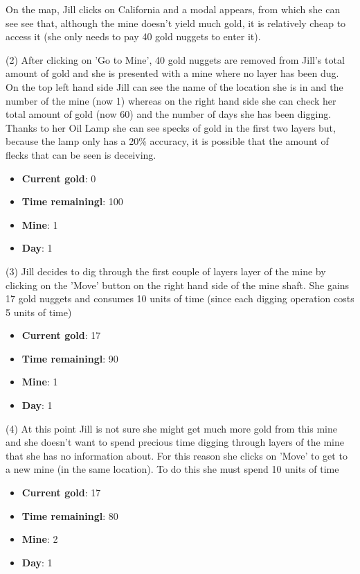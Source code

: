 \documentclass{mproj}
\begin{document}
On the map, Jill clicks on California and a modal appears, from which she can see see that, although the mine doesn't yield much gold, it is relatively cheap to access it (she only needs to pay 40 gold nuggets to enter it).

(2) After clicking on 'Go to Mine', 40 gold nuggets are removed from Jill's total amount of gold and she is presented with a mine where no layer has been dug. On the top left hand side Jill can see the name of the location she is in and the number of the mine (now 1) whereas on the right hand side she can check her total amount of gold (now 60) and the number of days she has been digging. Thanks to her Oil Lamp she can see specks of gold in the first two layers but, because the lamp only has a 20\% accuracy, it is possible that the amount of flecks that can be seen is deceiving. 
\begin{itemize}
	\item \textbf{Current gold}: 0
  	\item \textbf{Time remainingl}: 100
  	\item \textbf{Mine}: 1
	\item \textbf{Day}: 1
\end{itemize} 

(3) Jill decides to dig through the first couple of layers layer of the mine by clicking on the 'Move' button on the right hand side of the mine shaft. She gains 17 gold nuggets and consumes 10 units of time (since each digging operation costs 5 units of time)
\begin{itemize}
	\item \textbf{Current gold}: 17
  	\item \textbf{Time remainingl}: 90
  	\item \textbf{Mine}: 1
	\item \textbf{Day}: 1
\end{itemize} 

(4) At this point Jill is not sure she might get much more gold from this mine and she doesn't want to spend precious time digging through layers of the mine that she has no information about. For this reason she clicks on 'Move' to get to a new mine (in the same location). To do this she must spend 10 units of time
\begin{itemize}
	\item \textbf{Current gold}: 17
  	\item \textbf{Time remainingl}: 80
  	\item \textbf{Mine}: 2
	\item \textbf{Day}: 1
\end{itemize} 
\end{document}
